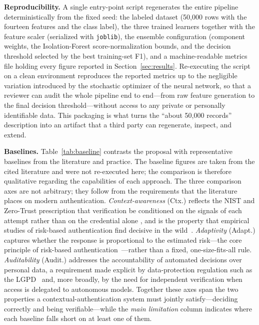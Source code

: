 \documentclass[conference]{IEEEtran}
\begin{document}
\textbf{Reproducibility.} A single entry-point script regenerates the
entire pipeline deterministically from the fixed seed: the labeled
dataset (50{,}000 rows with the fourteen features and the class label),
the three trained learners together with the feature scaler (serialized
with \texttt{joblib}), the ensemble configuration (component weights,
the Isolation-Forest score-normalization bounds, and the decision
threshold selected by the best training-set F1), and a machine-readable
metrics file holding every figure reported in
Section~\ref{sec:results}. Re-executing the script on a clean
environment reproduces the reported metrics up to the negligible
variation introduced by the stochastic optimizer of the neural network,
so that a reviewer can audit the whole pipeline end to end---from raw
feature generation to the final decision threshold---without access to
any private or personally identifiable data. This packaging is what
turns the ``about 50{,}000 records'' description into an artifact that a
third party can regenerate, inspect, and extend.

\textbf{Baselines.} Table~\ref{tab:baseline} contrasts the proposal
with representative baselines from the literature and practice. The
baseline figures are taken from the cited literature and were not
re-executed here; the comparison is therefore qualitative regarding the
capabilities of each approach. The three comparison axes are not
arbitrary; they follow from the requirements that the literature places
on modern authentication. \emph{Context-awareness} (Ctx.) reflects the
NIST and Zero-Trust prescription that verification be conditioned on the
signals of each attempt rather than on the credential alone
\cite{nist80063b,rose2020}, and is the property that empirical studies
of risk-based authentication find decisive in the
wild~\cite{wiefling2019,freeman2016}. \emph{Adaptivity} (Adapt.)
captures whether the response is proportional to the estimated
risk---the core principle of risk-based
authentication~\cite{nist80063b,wiefling2019,wiefling2023}---rather than
a fixed, one-size-fits-all rule. \emph{Auditability} (Audit.) addresses
the accountability of automated decisions over personal data, a
requirement made explicit by data-protection regulation such as the
LGPD~\cite{lgpd2018} and, more broadly, by the need for independent
verification when access is delegated to autonomous models. Together
these axes span the two properties a contextual-authentication system
must jointly satisfy---deciding correctly and being verifiable---while
the \emph{main limitation} column indicates where each baseline falls
short on at least one of them.
\end{document}
